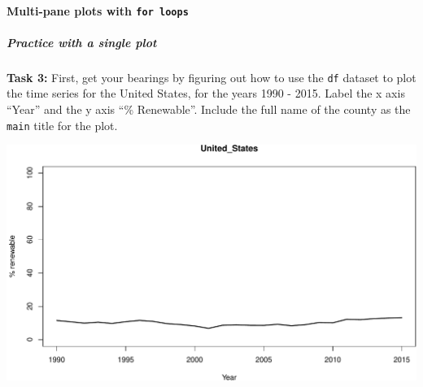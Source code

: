 \documentclass[
]{book}
\newenvironment{Shaded}{\begin{snugshade}}{\end{snugshade}}
\newcommand{\CommentTok}[1]{\textcolor[rgb]{0.56,0.35,0.01}{\textit{#1}}}
\newcommand{\DataTypeTok}[1]{\textcolor[rgb]{0.13,0.29,0.53}{#1}}
\newcommand{\DecValTok}[1]{\textcolor[rgb]{0.00,0.00,0.81}{#1}}
\newcommand{\KeywordTok}[1]{\textcolor[rgb]{0.13,0.29,0.53}{\textbf{#1}}}
\newcommand{\NormalTok}[1]{#1}
\newcommand{\StringTok}[1]{\textcolor[rgb]{0.31,0.60,0.02}{#1}}
\begin{document}
\hypertarget{multi-pane-plots-with-for-loops}{%
\paragraph{\texorpdfstring{Multi-pane plots with \texttt{for\ loops}}{Multi-pane plots with for loops}}\label{multi-pane-plots-with-for-loops}}

\hypertarget{practice-with-a-single-plot}{%
\subparagraph{Practice with a single plot}\label{practice-with-a-single-plot}}

\textbf{Task 3:} First, get your bearings by figuring out how to use the \texttt{df} dataset to plot the time series for the United States, for the years 1990 - 2015. Label the x axis ``Year'' and the y axis ``\% Renewable''. Include the full name of the county as the \texttt{main} title for the plot.

\begin{Shaded}
\end{Shaded}

\includegraphics{figures/unnamed-chunk-283-1.pdf}
\end{document}
